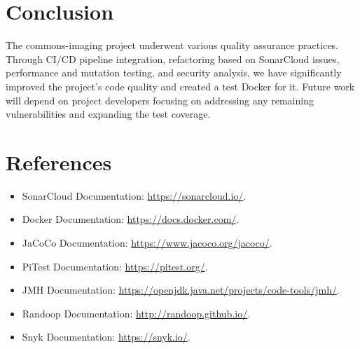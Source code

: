 \documentclass[a4paper,12pt]{report}
\begin{document}
\chapter{Conclusion}
The commons-imaging project underwent various quality assurance practices. Through CI/CD pipeline integration, refactoring based on SonarCloud issues, performance and mutation testing, and security analysis, we have significantly improved the project’s code quality and created a test Docker for it. Future work will depend on project developers focusing on addressing any remaining vulnerabilities and expanding the test coverage.

\newpage

\chapter{References}
\begin{itemize}
    \item SonarCloud Documentation: \url{https://sonarcloud.io/}.
    \item Docker Documentation: \url{https://docs.docker.com/}.
    \item JaCoCo Documentation: \url{https://www.jacoco.org/jacoco/}.
    \item PiTest Documentation: \url{https://pitest.org/}.
    \item JMH Documentation: \url{https://openjdk.java.net/projects/code-tools/jmh/}.
    \item Randoop Documentation: \url{http://randoop.github.io/}.
    \item Snyk Documentation: \url{https://snyk.io/}.
\end{itemize}
\end{document}

